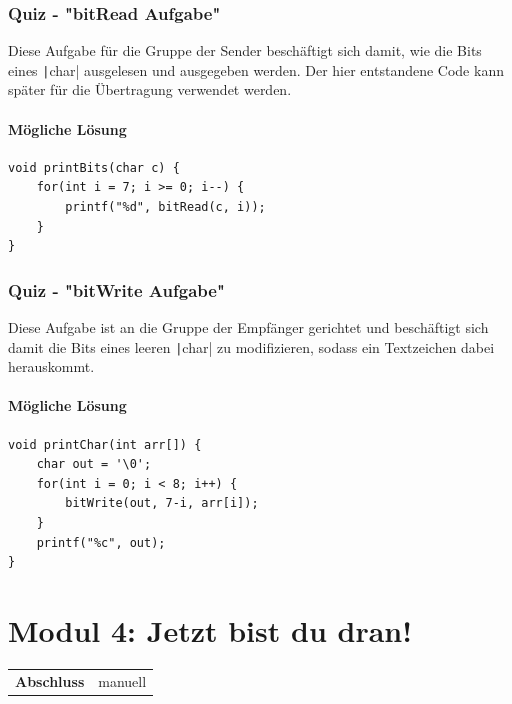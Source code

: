 \documentclass[a4paper]{article}
\begin{document}
\subsubsection{Quiz - "bitRead Aufgabe"}
Diese Aufgabe für die Gruppe der Sender beschäftigt sich damit, wie die Bits eines \texttt|char| ausgelesen und ausgegeben werden. Der hier entstandene Code kann später für die Übertragung verwendet werden.

\paragraph{Mögliche Lösung}
\begin{verbatim}
void printBits(char c) {
    for(int i = 7; i >= 0; i--) {
        printf("%d", bitRead(c, i));
    }
}
\end{verbatim}

\subsubsection{Quiz - "bitWrite Aufgabe"}
Diese Aufgabe ist an die Gruppe der Empfänger gerichtet und beschäftigt sich damit die Bits eines leeren \texttt|char| zu modifizieren, sodass ein Textzeichen dabei herauskommt.

\paragraph{Mögliche Lösung}
\begin{verbatim}
void printChar(int arr[]) {
    char out = '\0';
    for(int i = 0; i < 8; i++) {
        bitWrite(out, 7-i, arr[i]);
    }
    printf("%c", out);
}
\end{verbatim}


\section{Modul 4: Jetzt bist du dran!}
\begin{tabular}{@{}l l}
    \textbf{Abschluss} & manuell
\end{tabular}
\end{document}
